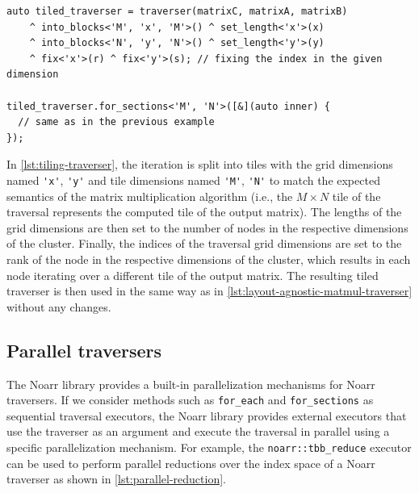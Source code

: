 \begin{lstlisting}[style=C++, caption={Applying a tiling transformation to a Noarr traverser}, label=lst:tiling-traverser,basicstyle=\ttfamily\scriptsize]
auto tiled_traverser = traverser(matrixC, matrixA, matrixB)
    ^ into_blocks<'M', 'x', 'M'>() ^ set_length<'x'>(x)
    ^ into_blocks<'N', 'y', 'N'>() ^ set_length<'y'>(y)
    ^ fix<'x'>(r) ^ fix<'y'>(s); // fixing the index in the given dimension

tiled_traverser.for_sections<'M', 'N'>([&](auto inner) {
  // same as in the previous example
});
\end{lstlisting}

In \cref{lst:tiling-traverser}, the iteration is split into tiles with the grid dimensions named \lstinline{'x'}, \lstinline{'y'} and tile dimensions named \lstinline{'M'}, \lstinline{'N'} to match the expected semantics of the matrix multiplication algorithm (i.e., the $M\times N$ tile of the traversal represents the computed tile of the output matrix). The lengths of the grid dimensions are then set to the number of nodes in the respective dimensions of the cluster. Finally, the indices of the traversal grid dimensions are set to the rank of the node in the respective dimensions of the cluster, which results in each node iterating over a different tile of the output matrix. The resulting tiled traverser is then used in the same way as in \cref{lst:layout-agnostic-matmul-traverser} without any changes.


\subsection{Parallel traversers}\label{sec:parallel-traversers}

The Noarr library  provides a built-in parallelization mechanisms for Noarr traversers. If we consider methods such as \lstinline{for_each} and \lstinline{for_sections} as sequential traversal executors, the Noarr library  provides external executors that use the traverser as an argument and execute the traversal in parallel using a specific parallelization mechanism. For example, the \lstinline{noarr::tbb_reduce} executor can be used to perform parallel reductions over the index space of a Noarr traverser as shown in \cref{lst:parallel-reduction}.

